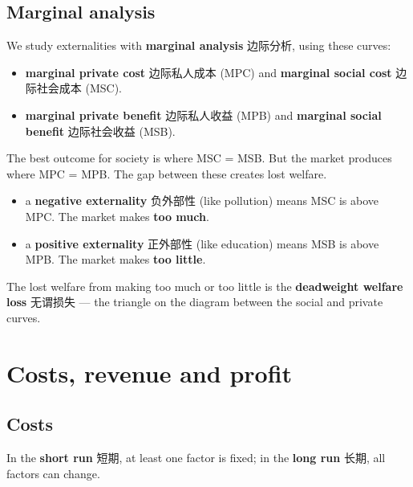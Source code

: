 \documentclass[11pt]{article}
\begin{document}
\subsection*{Marginal analysis}

We study externalities with \textbf{marginal analysis} 边际分析, using these curves:

\begin{itemize}
\item \textbf{marginal private cost} 边际私人成本 (MPC) and \textbf{marginal social cost} 边际社会成本 (MSC).

\item \textbf{marginal private benefit} 边际私人收益 (MPB) and \textbf{marginal social benefit} 边际社会收益 (MSB).

\end{itemize}

The best outcome for society is where MSC = MSB. But the market produces where MPC = MPB. The gap between these creates lost welfare.

\begin{itemize}
\item a \textbf{negative externality} 负外部性 (like pollution) means MSC is above MPC. The market makes \textbf{too much}.

\item a \textbf{positive externality} 正外部性 (like education) means MSB is above MPB. The market makes \textbf{too little}.

\end{itemize}

The lost welfare from making too much or too little is the \textbf{deadweight welfare loss} 无谓损失 — the triangle on the diagram between the social and private curves.

\section*{Costs, revenue and profit}

\subsection*{Costs}

In the \textbf{short run} 短期, at least one factor is fixed; in the \textbf{long run} 长期, all factors can change.
\end{document}
